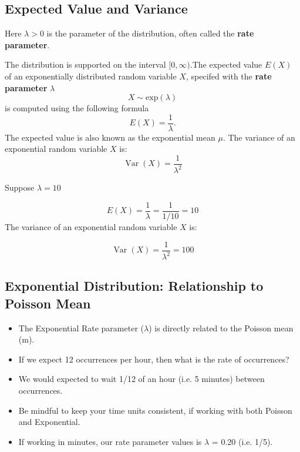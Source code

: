 \documentclass[a4paper,12pt]{article}
\begin{document}

\subsection*{Expected Value and Variance}

Here $\lambda > 0$ is the parameter of the distribution, often called the \textbf{rate parameter}. 

The distribution is supported on the interval $[0, \infty)$.The expected value $E(X)$ of an exponentially distributed random variable $X$, specifed with the \textbf{rate parameter} $\lambda$
\[ X \sim \mbox{exp}(\lambda)  \]
is computed using the following formula
\[ E(X) = \frac{1}{\lambda}. \]
The expected value is also known as the exponential mean $\mu$.
\smallskip
\noindent The variance of an exponential random variable $X$ is:
\[\operatorname{Var}(X) = \frac{1}{\lambda^2}\]

\noindent Suppose $\lambda=10$


\[
E(X) = \frac{1}{\lambda} = \frac{1}{1/10} = 10 \]
The variance of an exponential random variable $X$ is:

\[\operatorname{Var}(X) = \frac{1}{\lambda^2} = 100\]







\subsection*{Exponential Distribution: Relationship to Poisson Mean}
\begin{itemize}
\item The Exponential Rate parameter ($\lambda$) is directly related to the Poisson mean (m).
\item If we expect 12 occurrences per hour, then what is the rate of occurrences?
\item We would expected to wait 1/12 of an hour (i.e. 5 minutes) between occurrences.
\item Be mindful to keep your time units consistent, if working with both Poisson and Exponential.
\item If working in minutes, our rate parameter values is $\lambda$ = 0.20 (i.e. 1/5).
\end{itemize}
\end{document}
